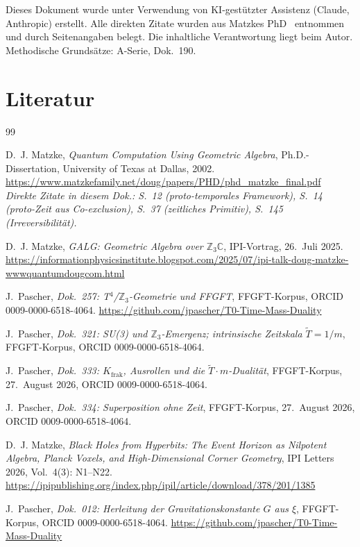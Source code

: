 \noindent
Dieses Dokument wurde unter Verwendung von KI-gestützter Assistenz
(Claude, Anthropic) erstellt.
Alle direkten Zitate wurden aus Matzkes PhD~\cite{Matzke2002}
entnommen und durch Seitenangaben belegt.
Die inhaltliche Verantwortung liegt beim Autor.
Methodische Grundsätze: A-Serie, Dok.~190.

\section*{Literatur}

\begin{thebibliography}{99}

D.~J. Matzke,
\textit{Quantum Computation Using Geometric Algebra},
Ph.D.-Dissertation, University of Texas at Dallas, 2002.
\url{https://www.matzkefamily.net/doug/papers/PHD/phd_matzke_final.pdf}\\
\textit{Direkte Zitate in diesem Dok.: S.~12 (proto-temporales Framework),
S.~14 (proto-Zeit aus Co-exclusion), S.~37 (zeitliches Primitiv),
S.~145 (Irreversibilität).}

D.~J. Matzke,
\textit{GALG: Geometric Algebra over $\mathbb{Z}_3\mathbb{C}$},
IPI-Vortrag, 26.~Juli 2025.
\url{https://informationphysicsinstitute.blogspot.com/2025/07/ipi-talk-doug-matzke-wwwquantumdougcom.html}

J.~Pascher,
\textit{Dok.~257: T$^4$/$\mathbb{Z}_3$-Geometrie und FFGFT},
FFGFT-Korpus, ORCID 0009-0000-6518-4064.
\url{https://github.com/jpascher/T0-Time-Mass-Duality}

J.~Pascher,
\textit{Dok.~321: SU(3) und $\mathbb{Z}_3$-Emergenz;
intrinsische Zeitskala $\tilde{T}=1/m$},
FFGFT-Korpus, ORCID 0009-0000-6518-4064.

J.~Pascher,
\textit{Dok.~333: $K_\text{frak}$, Ausrollen und die
$\tilde{T}\cdot m$-Dualität},
FFGFT-Korpus, 27.~August 2026, ORCID 0009-0000-6518-4064.

J.~Pascher,
\textit{Dok.~334: Superposition ohne Zeit},
FFGFT-Korpus, 27.~August 2026, ORCID 0009-0000-6518-4064.


D.~J. Matzke,
\textit{Black Holes from Hyperbits: The Event Horizon as Nilpotent Algebra,
Planck Voxels, and High-Dimensional Corner Geometry},
IPI Letters 2026, Vol.~4(3): N1--N22.
\url{https://ipipublishing.org/index.php/ipil/article/download/378/201/1385}

J.~Pascher,
\textit{Dok.~012: Herleitung der Gravitationskonstante $G$ aus $\xi$},
FFGFT-Korpus, ORCID 0009-0000-6518-4064.
\url{https://github.com/jpascher/T0-Time-Mass-Duality}

\end{thebibliography}
